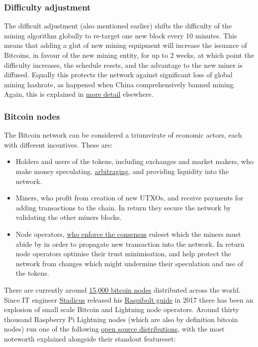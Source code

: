 \subsubsection{Difficulty adjustment}
The difficult adjustment (also mentioned earlier) shifts the difficulty of the mining algorithm globally to re-target one new block every 10 minutes. This means that adding a glut of new mining equipment will increase the issuance of Bitcoins, in favour of the new mining entity, for up to 2 weeks, at which point the difficulty increases, the schedule resets, and the advantage to the new miner is diffused. Equally this protects the network against significant loss of global mining hashrate, as happened when China comprehensively banned mining. Again, this is explained in \href{https://en.bitcoin.it/wiki/Difficulty}{more detail} elsewhere.
\subsubsection{Bitcoin nodes }
The Bitcoin network can be considered a triumvirate of economic actors, each with different incentives. These are:
\begin{itemize}
\item Holders and users of the tokens, including exchanges and market makers, who make money speculating, \href{https://en.wikipedia.org/wiki/Arbitrage}{arbitraging}, and providing liquidity into the network.
\item Miners, who profit from creation of new UTXOs, and receive payments for adding transactions to the chain. In return they secure the network by validating the other miners blocks.
\item Node operators, \href{https://www.truthcoin.info/blog/measuring-decentralization/}{who enforce the consensus} ruleset which the miners must abide by in order to propagate new transaction into the network. In return node operators optimise their trust minimisation, and help protect the network from changes which might undermine their speculation and use of the tokens.
\end{itemize}
There are currently around \href{https://bitnodes.io/}{15,000 bitcoin nodes} distributed across the world. 
Since IT engineer \href{https://stadicus.com/}{Stadicus} released his \href{https://raspibolt.org/backstory.html}{Raspibolt guide} in 2017 there has been an explosion of small scale Bitcoin and Lightning node operators. 
Around thirty thousand Raspberry Pi Lightning nodes (which are also by definition bitcoin nodes) run one of the following \href{https://github.com/bavarianledger/bitcoin-nodes}{open source distributions}, with the most noteworth explained alongside their standout featureset:
